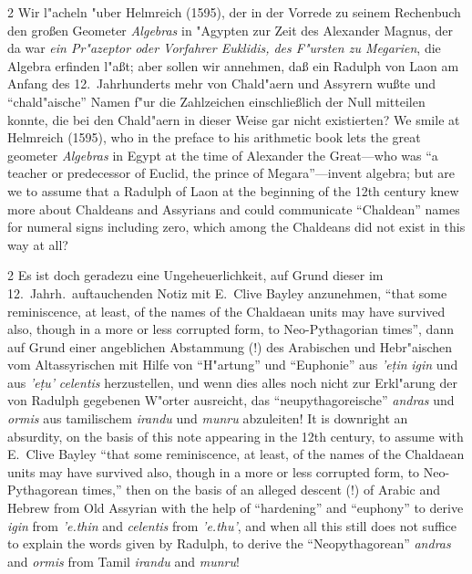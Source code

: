 \documentclass[10pt,a4paper]{article}
\renewcommand{\switchcolumn}{\syncronize\nointerlineskip\columnbreak}
\newcommand{\s}[1]{\d{#1}}
\newcommand{\enquote}[1]{``#1''}
\begin{document}
\begin{paracol}{2}
Wir l"acheln "uber Helmreich (1595), der in der Vorrede zu seinem Rechenbuch den gro\ss{}en Geometer \textit{Algebras} in "Agypten zur Zeit des Alexander Magnus, der da war \textit{ein Pr"azeptor oder Vorfahrer Euklidis, des F"ursten zu Megarien}, die Algebra erfinden l"a\ss{}t; aber sollen wir annehmen, da\ss{} ein Radulph von Laon am Anfang des 12.\ Jahrhunderts mehr von Chald"aern und Assyrern wu\ss{}te und \enquote{chald"aische} Namen f"ur die Zahlzeichen einschlie\ss{}lich der Null mitteilen konnte, die bei den Chald"aern in dieser Weise gar nicht existierten?
\switchcolumn
We smile at Helmreich (1595), who in the preface to his arithmetic book lets the great geometer \textit{Algebras} in Egypt at the time of Alexander the Great---who was ``a teacher or predecessor of Euclid, the prince of Megara''---invent algebra; but are we to assume that a Radulph of Laon at the beginning of the 12th century knew more about Chaldeans and Assyrians and could communicate ``Chaldean'' names for numeral signs including zero, which among the Chaldeans did not exist in this way at all?
\end{paracol}

\begin{paracol}{2}
Es ist doch geradezu eine Ungeheuerlichkeit, auf Grund dieser im 12.\ Jahrh.\ auftauchenden Notiz mit E.\ Clive Bayley anzunehmen, \enquote{that some reminiscence, at least, of the names of the Chaldaean units may have survived also, though in a more or less corrupted form, to Neo-Pythagorian times}, dann auf Grund einer angeblichen Abstammung (!) des Arabischen und Hebr"aischen vom Altassyrischen mit Hilfe von \enquote{H"artung} und \enquote{Euphonie} aus \textit{'e\s{t}in} \textit{igin} und aus \textit{'e\s{t}u'} \textit{celentis} herzustellen, und wenn dies alles noch nicht zur Erkl"arung der von Radulph gegebenen W"orter ausreicht, das \enquote{neupythagoreische} \textit{andras} und \textit{ormis} aus tamilischem \textit{irandu} und \textit{munru} abzuleiten!
\switchcolumn
It is downright an absurdity, on the basis of this note appearing in the 12th century, to assume with E.\ Clive Bayley ``that some reminiscence, at least, of the names of the Chaldaean units may have survived also, though in a more or less corrupted form, to Neo-Pythagorean times,'' then on the basis of an alleged descent (!) of Arabic and Hebrew from Old Assyrian with the help of ``hardening'' and ``euphony'' to derive \textit{igin} from \textit{'e.thin} and \textit{celentis} from \textit{'e.thu'}, and when all this still does not suffice to explain the words given by Radulph, to derive the ``Neopythagorean'' \textit{andras} and \textit{ormis} from Tamil \textit{irandu} and \textit{munru}!
\end{paracol}
\end{document}
